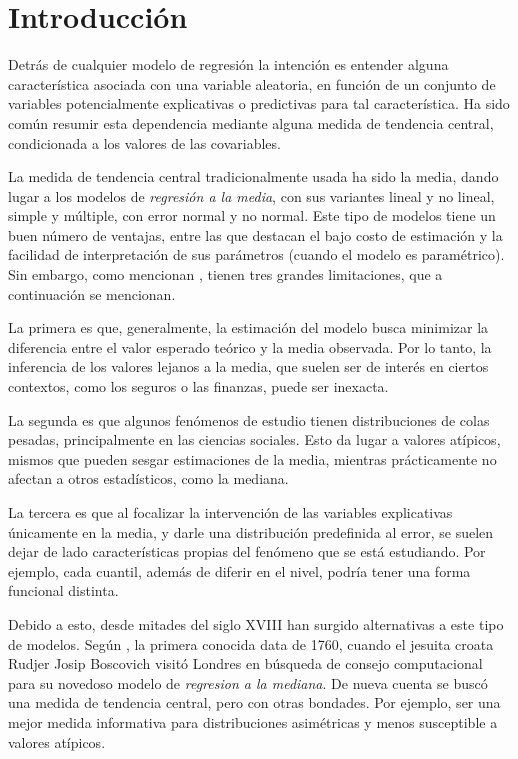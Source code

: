 \chapter{Introducci\'on}

Detr\'as de cualquier modelo de regresi\'on la intenci\'on es entender alguna caracter\'istica asociada con una variable aleatoria, en funci\'on de un conjunto de variables potencialmente explicativas o predictivas para tal caracter\'istica. Ha sido com\'un resumir esta dependencia mediante alguna medida de tendencia central, condicionada a los valores de las covariables.

La medida de tendencia central tradicionalmente usada ha sido la media, dando lugar a los modelos de \textit{regresi\'on a la media}, con sus variantes lineal y no lineal, simple y m\'ultiple, con error normal y no normal. Este tipo de modelos tiene un buen n\'umero de ventajas, entre las que destacan el bajo costo de estimaci\'on y la facilidad de interpretaci\'on de sus par\'ametros (cuando el modelo es param\'etrico). Sin embargo, como mencionan \cite{Hao_FrecQuantReg}, tienen tres grandes limitaciones, que a continuaci\'on se mencionan.

La primera es que, generalmente, la estimaci\'on del modelo busca minimizar la diferencia entre el valor esperado te\'orico y la media observada. Por lo tanto, la inferencia de los valores lejanos a la media, que suelen ser de inter\'es en ciertos contextos, como los seguros o las finanzas, puede ser inexacta.

La segunda es que algunos fen\'omenos de estudio tienen distribuciones de colas pesadas, principalmente en las ciencias sociales. Esto da lugar a valores at\'ipicos, mismos que pueden sesgar estimaciones de la media, mientras prácticamente no afectan a otros estadísticos, como la mediana.

La tercera es que al focalizar la intervenci\'on de las variables explicativas \'unicamente en la media, y darle una distribución predefinida al error, se suelen dejar de lado caracter\'isticas propias del fen\'omeno que se est\'a estudiando. Por ejemplo, cada cuantil, adem\'as de diferir en el nivel, podr\'ia tener una forma funcional distinta.

Debido a esto, desde mitades del siglo XVIII han surgido alternativas a este tipo de modelos. Seg\'un \cite{Hao_FrecQuantReg}, la primera conocida data de 1760, cuando el jesuita croata Rudjer Josip Boscovich visit\'o Londres en b\'usqueda de consejo computacional para su novedoso modelo de \textit{regresi\’on a la mediana}. De nueva cuenta se busc\'o una medida de tendencia central, pero con otras bondades. Por ejemplo, ser una mejor medida informativa para distribuciones asim\'etricas y menos susceptible a valores at\'ipicos. 

